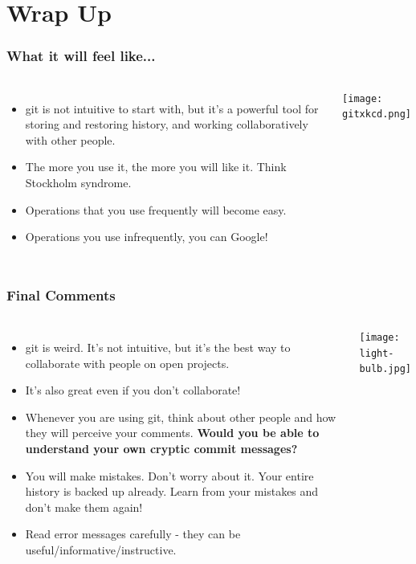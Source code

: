 \documentclass{beamer}
\begin{document}
\section{Wrap Up}

\begin{frame}
\frametitle{What it will feel like...}
\begin{columns}
\begin{itemize}
\item git is not intuitive to start with, but it's %
a powerful tool for storing and restoring history, and working collaboratively with other people.
\item The more you use it, the more you will like it. Think Stockholm syndrome.
\item Operations that you use frequently will become easy.
\item Operations you use infrequently, you can Google!
\end{itemize}
\texttt{[image: gitxkcd.png]}
\end{columns}
\end{frame}

\begin{frame}
\frametitle{Final Comments}
\begin{columns}
\begin{itemize}
\item git is weird. It's not intuitive, but it's the best way to collaborate with people on open projects.
\item It's also great even if you don't collaborate!
\item Whenever you are using git, think about other people and how they will perceive your comments. \textbf{Would you be able to understand your own cryptic commit messages?}
\item You will make mistakes. Don't worry about it. Your entire history is backed up already. Learn from your mistakes and don't make them again!
\item Read error messages carefully - they can be useful/informative/instructive.
\end{itemize}
\texttt{[image: light-bulb.jpg]}
\end{columns}
\end{frame}
\end{document}

